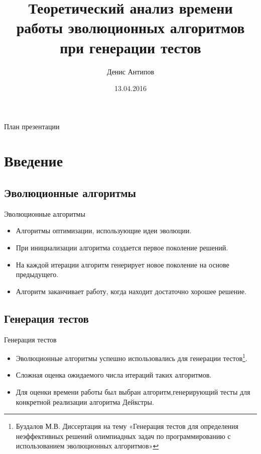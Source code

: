 \documentclass{beamer}
\begin{document}
\title[Автоматическая генерация тестов]{Теоретический анализ времени работы эволюционных алгоритмов при генерации тестов}
\author[Денис Антипов]{Денис Антипов}
\date{13.04.2016}

 
\begin{frame}
 \maketitle
\end{frame}
 
 \begin{frame}{План презентации}
  \tableofcontents
 \end{frame}

 \section{Введение}
 \subsection{Эволюционные алгоритмы}
 \begin{frame}{Эволюционные алгоритмы}
  \begin{itemize}
   \item Алгоритмы оптимизации, использующие идеи эволюции.
   \item При инициализации алгоритма создается первое поколение решений.
   \item На каждой итерации алгоритм генерирует новое поколение на основе предыдущего.
   \item Алгоритм заканчивает работу, когда находит достаточно хорошее решение.
  \end{itemize}
 \end{frame}
 
 \subsection{Генерация тестов}
 \begin{frame}{Генерация тестов}
  \begin{itemize}
   \item Эволюционные алгоритмы успешно использовались для генерации тестов\footnote{Буздалов М.В. Диссертация на тему «Генерация тестов для определения неэффективных решений олимпиадных задач по программированию с использованием эволюционных алгоритмов»}.
   \item Сложная оценка ожидаемого числа итераций таких алгоритмов.
   \item Для оценки времени работы был выбран алгоритм,генерирующий тесты для конкретной реализации алгоритма Дейкстры.
  \end{itemize}
 \end{frame}
 
\end{document}
